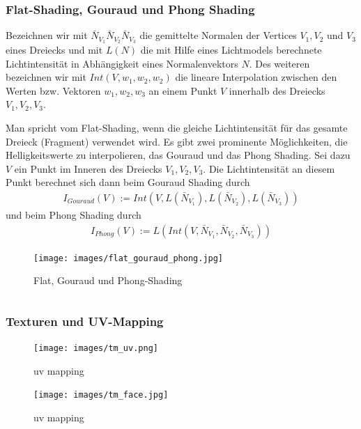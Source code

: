 \subsubsection{Flat-Shading, Gouraud und Phong Shading}
Bezeichnen wir mit  $\bar{N}_{V_1} \bar{N}_{V_2} \bar{N}_{V_3}$ die gemittelte Normalen der Vertices $V_1, V_2$ und $V_3$ eines Dreiecks  und mit
$L(N)$ die mit Hilfe eines Lichtmodels berechnete Lichtintensität in Abhängigkeit eines Normalenvektors $N$. Des weiteren bezeichnen wir mit 
$Int(V, w_1, w_2, w_2)$ die lineare Interpolation zwischen den Werten bzw. Vektoren $w_1, w_2, w_3$ an einem  Punkt $V$ innerhalb  des Dreiecks    $V_1, V_2, V_3$.

Man spricht vom Flat-Shading, wenn die gleiche  Lichtintensität für das gesamte Dreieck (Fragment) verwendet wird.
Es gibt zwei prominente Möglichkeiten, die Helligkeitswerte zu interpolieren, das  Gouraud und das Phong Shading. 
Sei dazu $V$ ein Punkt im Inneren des Dreiecks    $V_1, V_2, V_3$. Die Lichtintensität an diesem Punkt berechnet sich dann beim Gouraud Shading durch
\begin{align}
I_{Gouraud}(V) := Int(V,  L (\bar{N}_{V_1}), L( \bar{N}_{V_2}), L( \bar{N}_{V_3} ))
\end{align} 
 und beim Phong Shading durch 
\begin{align}
I_{Phong}(V) := L (Int(V,\bar{N}_{V_1},  \bar{N}_{V_2}, \bar{N}_{V_3} ))
\end{align}


\begin{figure}[H]
    \centering
    \texttt{[image: images/flat\_gouraud\_phong.jpg]}
    \caption{Flat, Gouraud und Phong-Shading}
    \label{fig:shading-flat-phong-models}
\end{figure}
  \begin{lstlisting}
  \end{lstlisting}

\subsubsection{Texturen und UV-Mapping}
\begin{figure}[H]
    \centering
    \texttt{[image: images/tm\_uv.png]}
    \caption{uv mapping} %
    \label{fig:uv-mapping1}
\end{figure}

\begin{figure}[H]
    \centering
    \texttt{[image: images/tm\_face.jpg]}
    \caption{uv mapping} %
    \label{fig:uv-mapping2}
\end{figure}




